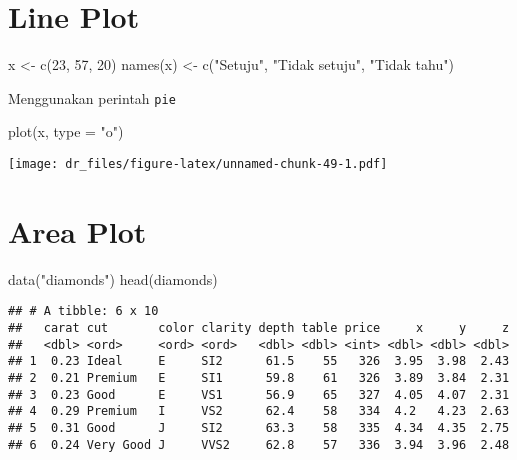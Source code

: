 \documentclass[
]{book}
\newenvironment{Shaded}{\begin{snugshade}}{\end{snugshade}}
\newcommand{\AttributeTok}[1]{\textcolor[rgb]{0.77,0.63,0.00}{#1}}
\newcommand{\DecValTok}[1]{\textcolor[rgb]{0.00,0.00,0.81}{#1}}
\newcommand{\FunctionTok}[1]{\textcolor[rgb]{0.00,0.00,0.00}{#1}}
\newcommand{\NormalTok}[1]{#1}
\newcommand{\OtherTok}[1]{\textcolor[rgb]{0.56,0.35,0.01}{#1}}
\newcommand{\StringTok}[1]{\textcolor[rgb]{0.31,0.60,0.02}{#1}}
\begin{document}
\hypertarget{line-plot}{%
\section{Line Plot}\label{line-plot}}

\begin{Shaded}
\begin{Highlighting}[]
\NormalTok{x }\OtherTok{\textless{}{-}} \FunctionTok{c}\NormalTok{(}\DecValTok{23}\NormalTok{, }\DecValTok{57}\NormalTok{, }\DecValTok{20}\NormalTok{)}
\FunctionTok{names}\NormalTok{(x) }\OtherTok{\textless{}{-}} \FunctionTok{c}\NormalTok{(}\StringTok{"Setuju"}\NormalTok{, }\StringTok{"Tidak setuju"}\NormalTok{, }\StringTok{"Tidak tahu"}\NormalTok{)}
\end{Highlighting}
\end{Shaded}

Menggunakan perintah \texttt{pie}

\begin{Shaded}
\begin{Highlighting}[]
\FunctionTok{plot}\NormalTok{(x, }\AttributeTok{type =} \StringTok{"o"}\NormalTok{)}
\end{Highlighting}
\end{Shaded}

\texttt{[image: dr\_files/figure-latex/unnamed-chunk-49-1.pdf]}

\hypertarget{area-plot}{%
\section{Area Plot}\label{area-plot}}

\begin{Shaded}
\begin{Highlighting}[]
\FunctionTok{data}\NormalTok{(}\StringTok{"diamonds"}\NormalTok{)}
\FunctionTok{head}\NormalTok{(diamonds)}
\end{Highlighting}
\end{Shaded}

\begin{verbatim}
## # A tibble: 6 x 10
##   carat cut       color clarity depth table price     x     y     z
##   <dbl> <ord>     <ord> <ord>   <dbl> <dbl> <int> <dbl> <dbl> <dbl>
## 1  0.23 Ideal     E     SI2      61.5    55   326  3.95  3.98  2.43
## 2  0.21 Premium   E     SI1      59.8    61   326  3.89  3.84  2.31
## 3  0.23 Good      E     VS1      56.9    65   327  4.05  4.07  2.31
## 4  0.29 Premium   I     VS2      62.4    58   334  4.2   4.23  2.63
## 5  0.31 Good      J     SI2      63.3    58   335  4.34  4.35  2.75
## 6  0.24 Very Good J     VVS2     62.8    57   336  3.94  3.96  2.48
\end{verbatim}
\end{document}
